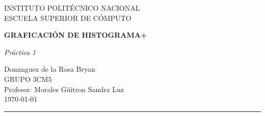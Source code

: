 \begin{titlepage}
\begin{center}
\begin{LARGE}
INSTITUTO POLITÉCNICO NACIONAL\\
\vspace*{0.15in}
ESCUELA SUPERIOR DE CÓMPUTO\\
\end{LARGE}
\vspace*{1.0in}
\begin{Large}
\textbf{GRAFICACIÓN DE HISTOGRAMA+} \\  
\end{Large}
\vspace*{0.2in}
\begin{large}
\textit{Práctica 1}\\
\end{large}
\vspace*{1.0in}
\begin{large}
Dominguez de la Rosa Bryan\\
\vspace*{2.0in}
GRUPO 3CM5\\
\vspace*{0.2in}
Profesor: Morales Güitron Sandra Luz\\
\vspace*{1.5in}
\today
\vspace*{0.3in}
\end{large}
\rule{150mm}{0.1mm}\\

\end{center}
\end{titlepage}
